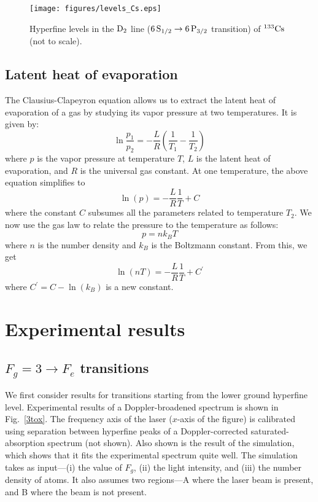 	\begin{figure}
	\centering
	\texttt{[image: figures/levels\_Cs.eps]}
	\caption{ Hyperfine levels in the $ \rm{D_2} $ line ($ \rm {6\,S_{1/2} \rightarrow 6\,P_{3/2}} $ transition) of $\rm{^{133}Cs} $ (not to scale).}
	\label{levels_Cs}
	\end{figure}
	
	\subsection{Latent heat of evaporation}
	
	The Clausius-Clapeyron equation allows us to extract the latent heat of evaporation of a gas by studying its vapor pressure at two temperatures. It is given by:
	\begin{equation}
	\ln \dfrac{p_1}{p_2} = - \dfrac{L}{R} \left(\dfrac{1}{T_1} - \dfrac{1}{T_2} \right)
	\end{equation}
	where $ p $ is the vapor pressure at temperature $ T $, $ L $ is the latent heat of evaporation, and $ R $ is the universal gas constant. At one temperature, the above equation simplifies to 
	\begin{equation}
	\ln (p) = - \dfrac{L}{R} \dfrac{1}{T} + C
	\end{equation} 
	where the constant $ C $ subsumes all the parameters related to temperature $ T_2 $. We now use the gas law to relate the pressure to the temperature as follows:
	\begin{equation}
	p = n k_B T
	\end{equation}
	where $ n $ is the number density and $ k_B $ is the Boltzmann constant. From this, we get
	\begin{equation}
	\label{nvsT}
	\ln(nT) = - \dfrac{L}{R} \dfrac{1}{T} + {C^{\prime}}
	\end{equation}
	where $ {C^{\prime}} = C - \ln(k_B) $ is a new constant.

\section{Experimental results}
	
	\subsection{$ F_g = 3 \rightarrow F_e $ transitions}
	
	We first consider results for transitions starting from the lower ground hyperfine level. Experimental results of a Doppler-broadened spectrum is shown in Fig.~\ref{3tox}. The frequency axis of the laser ($ x $-axis of the figure) is calibrated using separation between hyperfine peaks of a Doppler-corrected saturated-absorption spectrum (not shown). Also shown is the result of the simulation, which shows that it fits the experimental spectrum quite well. The simulation takes as input---(i) the value of $ F_g $, (ii) the light intensity, and (iii) the number density of atoms. It also assumes two regions---A where the laser beam is present, and B where the beam is not present.
	
